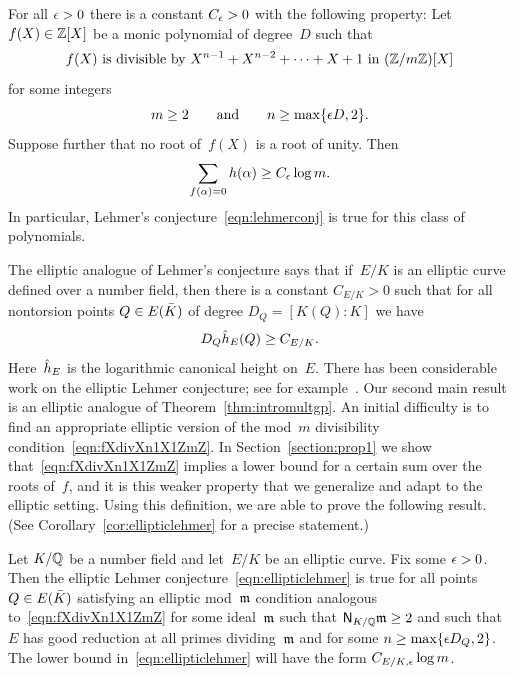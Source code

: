 \documentclass[12pt,reqno]{amsart}
\begin{document}
\begin{theorem}
\label{thm:intromultgp}
For all $\epsilon>0$ there is a constant $C_\epsilon>0$ with the following
property\textup: Let $f(X)\in\mathbb{Z}[X]$ be a monic polynomial of
degree~$D$ such that
\begin{equation}
  \label{eqn:fXdivXn1X1ZmZ}
  \text{$f(X)$ is divisible by $X^{n-1}+X^{n-2}+\cdots+X+1$ in $(\mathbb{Z}/m\mathbb{Z})[X]$}
\end{equation}
for some integers
\[
 m\ge2\qquad\text{and}\qquad n\ge\max\{\epsilon D,2\}.
\]
Suppose further that no root of~$f(X)$ is a root of unity. Then
\[
  \sum_{f(\alpha)=0} h(\alpha) \ge C_\epsilon\log m.
\]
In particular, Lehmer's conjecture~\eqref{eqn:lehmerconj} is true for this
class of polynomials.
\end{theorem}

The elliptic analogue of Lehmer's conjecture says that if~$E/K$
is an elliptic curve defined over a number field, then there
is a constant $C_{E/K}>0$ such that for all nontorsion 
points $Q\in E({\bar K})$ of degree $D_Q=[K(Q):K]$ we have
\begin{equation}
  \label{eqn:ellipticlehmer}
  D_Q {\hat h}_E(Q) \ge C_{E/K}.
\end{equation}
Here~${\hat h}_E$ is the logarithmic canonical height on~$E$.  There has
been considerable work on the elliptic Lehmer conjecture; see for
example~\cite{HiSi2,Laur,Mass}.  Our second main result is an elliptic
analogue of Theorem~\ref{thm:intromultgp}.  An initial difficulty is
to find an appropriate elliptic version of the mod~$m$ divisibility
condition~\eqref{eqn:fXdivXn1X1ZmZ}. In Section~\ref{section:prop1} we
show that~\eqref{eqn:fXdivXn1X1ZmZ} implies a lower bound for a
certain sum over the roots of~$f$, and it is this weaker property that
we generalize and adapt to the elliptic setting. Using this
definition, we are able to prove the following result.  (See
Corollary~\ref{cor:ellipticlehmer} for a precise statement.)

\begin{theorem}
\label{thm:mainthmintro}
Let $K/\mathbb{Q}$ be a number field and let~$E/K$ be an elliptic curve.  Fix
some $\epsilon>0$.  Then the elliptic Lehmer
conjecture~\eqref{eqn:ellipticlehmer} is true for all points~$Q\in
E({\bar K})$ satisfying an elliptic mod~${\mathfrak{m}}$ condition analogous
to~\eqref{eqn:fXdivXn1X1ZmZ} for some ideal~${\mathfrak{m}}$ such that
${\operatorname{\mathsf{N}}}_{K/\mathbb{Q}}{\mathfrak{m}}\ge2$ and such that~$E$ has good reduction at all
primes dividing~${\mathfrak{m}}$ and for some $n\ge\max\{\epsilon{D_Q},2\}$.  The
lower bound in~\eqref{eqn:ellipticlehmer} will have the form
$C_{E/K,\epsilon}\log m$.
\end{theorem}
\end{document}
